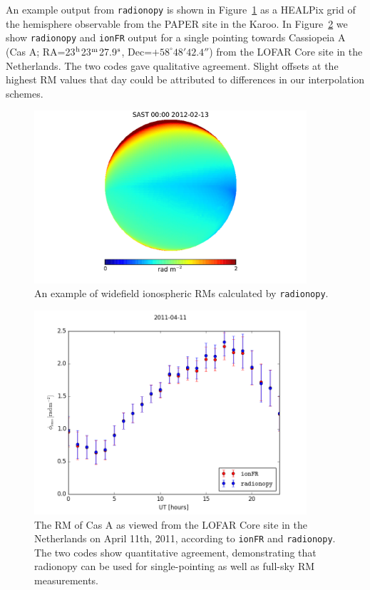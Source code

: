 An example output from {\tt radionopy} is shown in Figure~\ref{fig:ionosphere_radionopy_example} as a {\sc HEALPix} grid of the hemisphere observable from the PAPER site in the Karoo. In Figure~\ref{fig:ionfr_compare} we show {\tt radionopy} and {\tt ionFR} output for a single pointing towards Cassiopeia A (Cas A; RA=23$^{\rm h}$23$^{\rm m}$27.9$^{\rm s}$, Dec=$+58^{\circ}48'42.4''$) from the LOFAR Core site in the Netherlands. The two codes gave qualitative agreement. Slight offsets at the highest RM values that day could be attributed to differences in our interpolation schemes.

\begin{figure}
\centering
\includegraphics[width=0.9\textwidth]{chapters/ionosphere/figures/widefield_RM_snap.pdf}
\caption{An example of widefield ionospheric RMs calculated by {\tt radionopy}.}
\label{fig:ionosphere_radionopy_example}
\end{figure}

\begin{figure}
\centering
\includegraphics[width=0.9\textwidth]{chapters/ionosphere/figures/ionFRcompare.png}
\caption[The RM of Cas A as viewed from the LOFAR Core site in the Netherlands on April 11th, 2011, according to {\tt ionFR} and {\tt radionopy}.]{The RM of Cas A as viewed from the LOFAR Core site in the Netherlands on April 11th, 2011, according to {\tt ionFR} and {\tt radionopy}. The two codes show quantitative agreement, demonstrating that radionopy can be used for single-pointing as well as full-sky RM measurements.}
\label{fig:ionfr_compare}
\end{figure}

